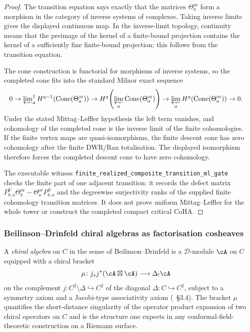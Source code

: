 \begin{proof}
The transition equation says exactly that the matrices
\(\Theta^{\mathrm{or}}_a\) form a morphism in the category of inverse
systems of complexes. Taking inverse limits gives the displayed
continuous map. In the inverse-limit topology, continuity means that
the preimage of the kernel of a finite-bound projection contains the
kernel of a sufficiently fine finite-bound projection; this follows
from the transition equation.

The cone construction is functorial for morphisms of inverse systems,
so the completed cone fits into the standard Milnor exact sequence
\[
 0\to
 \varprojlim\nolimits^{1}_{a}
 H^{q-1}\!\left(\operatorname{Cone}(\Theta^{\mathrm{or}}_a)\right)
 \to
 H^q\!\left(\varprojlim_a\operatorname{Cone}(\Theta^{\mathrm{or}}_a)\right)
 \to
 \varprojlim_a
 H^q\!\left(\operatorname{Cone}(\Theta^{\mathrm{or}}_a)\right)
 \to 0 .
\]
Under the stated Mittag--Leffler hypothesis the left term vanishes, and
cohomology of the completed cone is the inverse limit of the finite
cohomologies. If the finite vertex maps are quasi-isomorphisms, the
finite descent cone has zero cohomology after the finite DWR/Ran
totalisation. The displayed isomorphism therefore forces the completed
descent cone to have zero cohomology.

The executable witness
\texttt{finite\_realized\_composite\_transition\_ml\_gate} checks the
finite part of one adjacent transition: it records the defect matrix
\(P^V_{b,a}\Theta^{\mathrm{or}}_b-\Theta^{\mathrm{or}}_aP^S_{b,a}\)
and the degreewise surjectivity ranks of the supplied finite
cohomology transition matrices. It does not prove uniform
Mittag--Leffler for the whole tower or construct the completed compact
critical CoHA.
\end{proof}

\subsubsection{Beilinson--Drinfeld chiral algebras as factorisation cosheaves}

A \emph{chiral algebra} on $C$ in the sense of Beilinson--Drinfeld
\cite{BeilinsonDrinfeld} is a $\mathcal{D}$-module $\cA$ on $C$
equipped with a chiral bracket
\begin{equation}
\label{eq:bd-chiral-bracket}
 \mu \colon j_* j^{*} (\cA \boxtimes \cA) \longrightarrow
 \Delta_{!} \cA
\end{equation}
on the complement $j \colon C^2 \setminus \Delta \hookrightarrow C^2$
of the diagonal $\Delta \colon C \hookrightarrow C^2$, subject to a
symmetry axiom and a Jacobi-type associativity axiom
(\cite{BeilinsonDrinfeld}~\S3.4). The bracket $\mu$ quantifies the
short-distance singularity of the operator product expansion of two
chiral operators on $C$ and is the structure one expects in any
conformal-field-theoretic construction on a Riemann surface.

